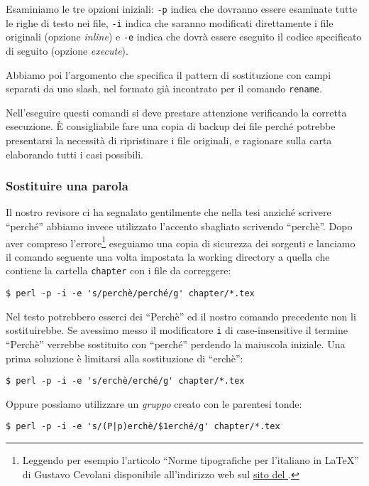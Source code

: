 Esaminiamo le tre opzioni iniziali: \texttt{-p} indica che dovranno essere
esaminate tutte le righe di testo nei file, \texttt{-i} indica che saranno
modificati direttamente i file originali (opzione \emph{inline}) e \texttt{-e}
indica che dovrà essere eseguito il codice specificato di seguito (opzione
\emph{execute}).

Abbiamo poi l'argomento che specifica il pattern di sostituzione con campi
separati da uno slash, nel formato già incontrato per il comando
\texttt{rename}.

Nell'eseguire questi comandi si deve prestare attenzione verificando la corretta
esecuzione. \`E consigliabile fare una copia di backup dei file perché potrebbe
presentarsi la necessità di ripristinare i file originali, e ragionare sulla
carta elaborando tutti i casi possibili.


\subsubsection{Sostituire una parola}

Il nostro revisore ci ha segnalato gentilmente che nella tesi anziché scrivere
``perché'' abbiamo invece utilizzato l'accento sbagliato scrivendo ``perchè''.
Dopo aver compreso l'errore\footnote{Leggendo per esempio l'articolo ``Norme
tipografiche per l’italiano in \LaTeX'' di Gustavo Cevolani disponibile
all'indirizzo web sul
\href{http://www.guitex.org/home/images/ArsTeXnica/AT001/norme\%20tipografiche\%20per\%20litaliano\%20in\%20latex.pdf}{sito
del \GuIT*}.} eseguiamo una copia di sicurezza dei sorgenti e lanciamo il
comando seguente una volta impostata la working directory a quella che contiene
la cartella \texttt{chapter} con i file da correggere:
\begin{verbatim}
$ perl -p -i -e 's/perchè/perché/g' chapter/*.tex
\end{verbatim}

Nel testo potrebbero esserci dei ``Perchè'' ed il nostro comando precedente non
li sostituirebbe. Se avessimo messo il modificatore \texttt{i} di
case-insensitive il termine ``Perchè'' verrebbe sostituito con ``perché''
perdendo la maiuscola iniziale.
Una prima soluzione è limitarsi alla sostituzione di ``erchè'':
\begin{verbatim}
$ perl -p -i -e 's/erchè/erché/g' chapter/*.tex
\end{verbatim}

Oppure possiamo utilizzare un \emph{gruppo} creato con le parentesi tonde:
\begin{verbatim}
$ perl -p -i -e 's/(P|p)erchè/$1erché/g' chapter/*.tex
\end{verbatim}

